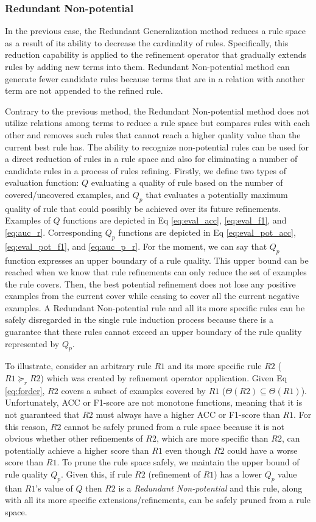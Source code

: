 \documentclass{bmcart}
\begin{document}
\subsubsection*{Redundant Non-potential}
In the previous case, the Redundant Generalization method reduces a rule space as a result of its ability to decrease the cardinality of rules. Specifically, this reduction capability is applied to the refinement operator that gradually extends rules by adding new terms into them. Redundant Non-potential method can generate fewer candidate rules because terms that are in a relation with another term are not appended to the refined rule.


Contrary to the previous method, the Redundant Non-potential method does not utilize relations among terms to reduce a rule space but compares rules with each other and removes such rules that cannot reach a higher quality value than the current best rule has. The ability to recognize non-potential rules can be used for a direct reduction of rules in a rule space and also for eliminating a number of candidate rules in a process of rules refining. Firstly, we define two types of evaluation function: $Q$ evaluating a quality of rule based on the number of covered/uncovered examples, and $Q_p$ that evaluates a potentially maximum quality of rule that could possibly be achieved over its future refinements. Examples of $Q$ functions are depicted in Eq \ref{eq:eval_acc}, \ref{eq:eval_f1}, and \ref{eq:auc_r}. Corresponding $Q_p$ functions are depicted in Eq \ref{eq:eval_pot_acc}, \ref{eq:eval_pot_f1}, and \ref{eq:auc_p_r}. For the moment, we can say that $Q_p$ function expresses an upper boundary of a rule quality. This upper bound can be reached when we know that rule refinements can only reduce the set of examples the rule covers. Then, the best potential refinement does not lose any positive examples from the current cover while ceasing to cover all the current negative examples.
A Redundant Non-potential rule and all its more specific rules can be safely disregarded in the single rule induction process because there is a guarantee that these rules cannot exceed an upper boundary of the rule quality represented by $Q_p$.


To illustrate, consider an arbitrary rule $R1$ and its more specific rule $R2$ ($R1 \succeq_{r} R2$) which was created by refinement operator application. Given Eq \ref{eq:forder}, $R2$ covers a subset of examples covered by $R1$ ($\Theta(R2) \subseteq \Theta(R1)$). Unfortunately, ACC or F1-score are not monotone functions, meaning that it is not guaranteed that $R2$ must always have a higher ACC or F1-score than $R1$. For this reason, $R2$ cannot be safely pruned from a rule space because it is not obvious whether other refinements of $R2$, which are more specific than $R2$, can potentially achieve a higher score than $R1$ even though $R2$ could have a worse score than $R1$. To prune the rule space safely, we maintain the upper bound of rule quality $Q_p$. Given this, if rule $R2$ (refinement of $R1$) has a lower $Q_p$ value than $R1$'s value of $Q$ then $R2$ is a \emph{Redundant Non-potential} and this rule, along with all its more specific extensions/refinements, can be safely pruned from a rule space.
\end{document}
